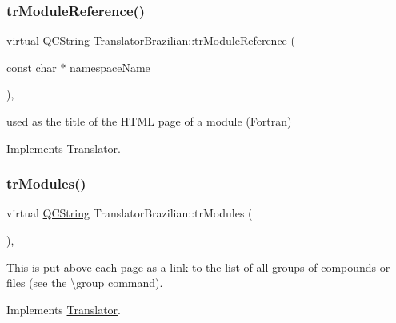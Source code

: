 \mbox{\label{class_translator_brazilian_a2dea89cde86eeb3a07d21b2b219118ef}} 
\subsubsection{\texorpdfstring{trModuleReference()}{trModuleReference()}}
{\footnotesize\ttfamily virtual \mbox{\hyperlink{class_q_c_string}{Q\+C\+String}} Translator\+Brazilian\+::tr\+Module\+Reference (\begin{DoxyParamCaption}\item[{const char $\ast$}]{namespace\+Name }\end{DoxyParamCaption})\hspace{0.3cm}{\ttfamily [inline]}, {\ttfamily [virtual]}}

used as the title of the H\+T\+ML page of a module (Fortran) 

Implements \mbox{\hyperlink{class_translator}{Translator}}.

\mbox{\label{class_translator_brazilian_ad517a77c3039e299995b00dfb5ba8629}} 
\subsubsection{\texorpdfstring{trModules()}{trModules()}}
{\footnotesize\ttfamily virtual \mbox{\hyperlink{class_q_c_string}{Q\+C\+String}} Translator\+Brazilian\+::tr\+Modules (\begin{DoxyParamCaption}{ }\end{DoxyParamCaption})\hspace{0.3cm}{\ttfamily [inline]}, {\ttfamily [virtual]}}

This is put above each page as a link to the list of all groups of compounds or files (see the \textbackslash{}group command). 

Implements \mbox{\hyperlink{class_translator}{Translator}}.

\mbox{\label{class_translator_brazilian_a5b812d2686f3e556c9c6e155d7d58217}} 
